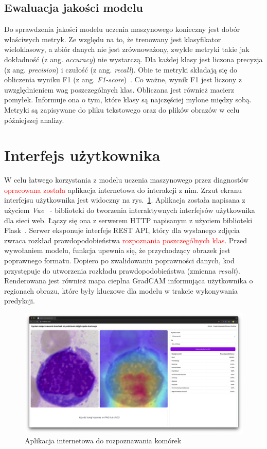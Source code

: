 \subsection{Ewaluacja jakości modelu}

Do sprawdzenia jakości modelu uczenia maszynowego konieczny jest dobór właściwych metryk.
Ze względu na to, że trenowany jest klasyfikator wieloklasowy, a zbiór danych nie jest zrównoważony, zwykłe metryki takie jak dokładność (z ang. \textit{accuracy}) nie wystarczą.
Dla każdej klasy jest liczona precyzja (z ang. \textit{precision}) i czułość (z ang. \textit{recall}).
Obie te metryki składają się do obliczenia wyniku F1 (z ang. \textit{F1-score})~\cite{geron}.
Co ważne, wynik F1 jest liczony z uwzględnieniem wag poszczególnych klas.
Obliczana jest również macierz pomyłek.
Informuje ona o tym, które klasy są najczęściej mylone między sobą.
Metryki są zapisywane do pliku tekstowego oraz do plików obrazów w celu późniejszej analizy.


\section{Interfejs użytkownika}

W celu łatwego korzystania z modelu uczenia maszynowego przez diagnostów \textcolor{red}{opracowana została} aplikacja internetowa do interakcji z nim.
Zrzut ekranu interfejsu użytkownika jest widoczny na rys.~\ref{fig:ui}.
Aplikacja została napisana z użyciem \textit{Vue}~\cite{vue} - biblioteki do tworzenia interaktywnych interfejsów użytkownika dla sieci web.
Łączy się ona z serwerem HTTP napisanym z użyciem biblioteki Flask~\cite{flask}.
Serwer eksponuje interfejs REST API, który dla wysłanego zdjęcia zwraca rozkład prawdopodobieństwa \textcolor{red}{ rozpoznania poszczególnych klas}.
Przed wywołaniem modelu, funkcja upewnia się, że przychodzący obrazek jest poprawnego formatu.
Dopiero po zwalidowaniu poprawności danych, kod przystępuje do utworzenia rozkładu prawdopodobieństwa (zmienna \textit{result}).
Renderowana jest również mapa cieplna GradCAM informująca użytkownika o regionach obrazu, które były kluczowe dla modelu w trakcie wykonywania predykcji.


\begin{figure}
    \centering
    \includegraphics[width=\textwidth]{app}
    \caption{Aplikacja internetowa do rozpoznawania komórek}
    \label{fig:ui}
\end{figure}



